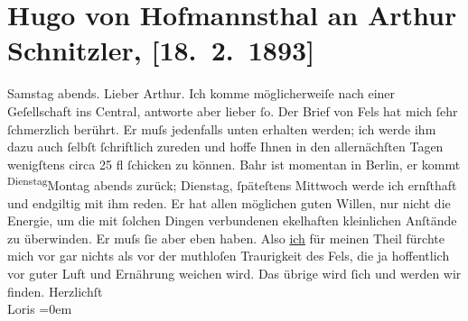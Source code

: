 

         
         \renewcommand{\erwaehntePersonen}{Personen: Hermann Bahr, Friedrich Michael Fels, Hugo von Hofmannsthal}
         \renewcommand{\erwaehnteOrte}{Orte: Berlin, Café Central, Wien}
         \renewcommand{\erwaehnteWerke}{}
               \section[Hugo von Hofmannsthal an Arthur Schnitzler, {[}18. 2. 1893{]}]{ Hugo von Hofmannsthal an Arthur Schnitzler, {[}18. 2. 1893{]}}\nopagebreak{}\rehead{ }\begin{ledgroupsized}[t]{13cm}\normalsize\beginnumbering \toendnotes[C]{\smallbreak\pagebreak[2]} 
\pstart
           \raggedleft{}{\pb}Samstag abends.\pend
           \pstart\center{}Lieber Arthur.\pend\pstart
           Ich komme möglicherweiſe nach einer Geſellschaft ins Central, antworte aber lieber ſo. Der Brief von Fels hat mich ſehr ſchmerzlich berührt. Er muſs jedenfalls
               unten erhalten werden; ich werde ihm dazu auch ſelbſt ſchriftlich zureden und hoffe
               Ihnen in den allernächſten Tagen wenigſtens circa 25 fl ſchicken zu können. Bahr ist momentan in Berlin, {\pb}er
               kommt \substVorne{}\textsuperscript{Dienstag}{\allowbreak}\substDazwischen{}Montag\substHinten{} abends zurück; Dienstag, ſpäteſtens Mittwoch werde ich ernſthaft und
               endgiltig mit ihm reden. Er hat allen möglichen guten Willen, nur nicht die Energie,
               um die mit ſolchen Dingen verbundenen ekelhaften kleinlichen Anſtände zu überwinden.
               Er muſs ſie aber eben haben. Also \uline{ich} für meinen
               Theil fürchte mich vor gar nichts als vor der muthloſen {\pb}Traurigkeit des Fels, die ja hoffentlich vor guter Luft und Ernährung weichen
               wird. Das übrige wird ſich und werden wir finden.\pend
           \pstart
           Herzlichſt{\\[\baselineskip]}\spacefill\mbox{Loris}\pend
           \leftskip=0em{}
         

\end{ledgroupsized}
